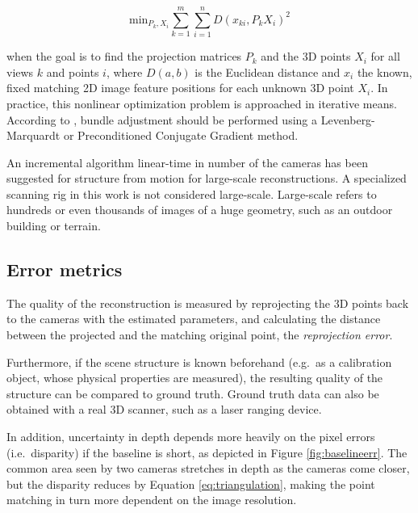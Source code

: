 \begin{equation}
	\text{min}_{P_k, X_i} \sum_{k=1}^m \sum_{i=1}^n D(x_{ki}, P_k X_i)^2
\end{equation}

when the goal is to find the projection matrices $P_k$ and the 3D points $X_i$ for all views $k$ and points $i$, where $D(a,b)$ is the Euclidean distance and $x_i$ the known, fixed matching 2D image feature positions for each unknown 3D point $X_i$.
In practice, this nonlinear optimization problem is approached in iterative means.
According to \cite{wu2013towards}, bundle adjustment should be performed using a Levenberg-Marquardt or Preconditioned Conjugate Gradient method.

An incremental algorithm linear-time in number of the cameras has been suggested for structure from motion for large-scale reconstructions. \cite{wu2013towards}
A specialized scanning rig in this work is not considered large-scale.
Large-scale refers to hundreds or even thousands of images of a huge geometry, such as an outdoor building or terrain.


\subsection{Error metrics} %

The quality of the reconstruction is measured by reprojecting the 3D points back to the cameras with the estimated parameters, and calculating the distance between the projected and the matching original point, the \emph{reprojection error}. \cite{hartley03multiview}

Furthermore, if the scene structure is known beforehand (e.g.\ as a calibration object, whose physical properties are measured), the resulting quality of the structure can be compared to ground truth.
Ground truth data can also be obtained with a real 3D scanner, such as a laser ranging device. %

In addition, uncertainty in depth depends more heavily on the pixel errors (i.e.\ disparity) if the baseline is short, as depicted in Figure \ref{fig:baselineerr}.
The common area seen by two cameras stretches in depth as the cameras come closer, but the disparity reduces by Equation \ref{eq:triangulation}, making the point matching in turn more dependent on the image resolution.

